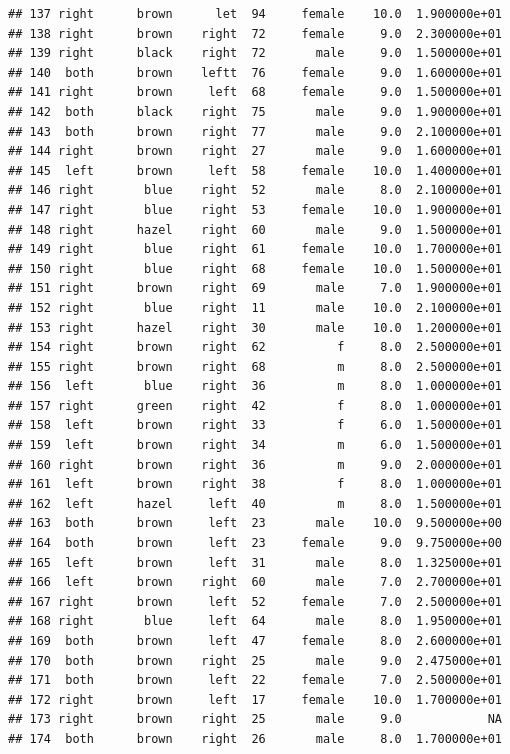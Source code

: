 \documentclass[]{article}
\begin{document}
\begin{verbatim}
## 137 right      brown      let  94     female    10.0  1.900000e+01
## 138 right      brown    right  72     female     9.0  2.300000e+01
## 139 right      black    right  72       male     9.0  1.500000e+01
## 140  both      brown    leftt  76     female     9.0  1.600000e+01
## 141 right      brown     left  68     female     9.0  1.500000e+01
## 142  both      black    right  75       male     9.0  1.900000e+01
## 143  both      brown    right  77       male     9.0  2.100000e+01
## 144 right      brown    right  27       male     9.0  1.600000e+01
## 145  left      brown     left  58     female    10.0  1.400000e+01
## 146 right       blue    right  52       male     8.0  2.100000e+01
## 147 right       blue    right  53     female    10.0  1.900000e+01
## 148 right      hazel    right  60       male     9.0  1.500000e+01
## 149 right       blue    right  61     female    10.0  1.700000e+01
## 150 right       blue    right  68     female    10.0  1.500000e+01
## 151 right      brown    right  69       male     7.0  1.900000e+01
## 152 right       blue    right  11       male    10.0  2.100000e+01
## 153 right      hazel    right  30       male    10.0  1.200000e+01
## 154 right      brown    right  62          f     8.0  2.500000e+01
## 155 right      brown    right  68          m     8.0  2.500000e+01
## 156  left       blue    right  36          m     8.0  1.000000e+01
## 157 right      green    right  42          f     8.0  1.000000e+01
## 158  left      brown    right  33          f     6.0  1.500000e+01
## 159  left      brown    right  34          m     6.0  1.500000e+01
## 160 right      brown    right  36          m     9.0  2.000000e+01
## 161  left      brown    right  38          f     8.0  1.000000e+01
## 162  left      hazel     left  40          m     8.0  1.500000e+01
## 163  both      brown     left  23       male    10.0  9.500000e+00
## 164  both      brown     left  23     female     9.0  9.750000e+00
## 165  left      brown     left  31       male     8.0  1.325000e+01
## 166  left      brown    right  60       male     7.0  2.700000e+01
## 167 right      brown     left  52     female     7.0  2.500000e+01
## 168 right       blue     left  64       male     8.0  1.950000e+01
## 169  both      brown     left  47     female     8.0  2.600000e+01
## 170  both      brown    right  25       male     9.0  2.475000e+01
## 171  both      brown     left  22     female     7.0  2.500000e+01
## 172 right      brown     left  17     female    10.0  1.700000e+01
## 173 right      brown    right  25       male     9.0            NA
## 174  both      brown    right  26       male     8.0  1.700000e+01

\end{verbatim}
\end{document}
